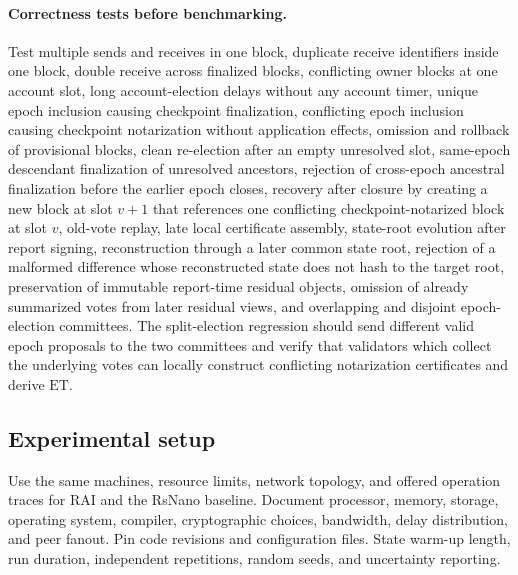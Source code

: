 \documentclass[10pt,twocolumn]{article}
\newcommand{\ET}{\mathrm{ET}}
\begin{document}
\begin{center}
\end{center}

\paragraph{Correctness tests before benchmarking.} Test multiple sends and receives in one block, duplicate receive identifiers inside one block, double receive across finalized blocks, conflicting owner blocks at one account slot, long account-election delays without any account timer, unique epoch inclusion causing checkpoint finalization, conflicting epoch inclusion causing checkpoint notarization without application effects, omission and rollback of provisional blocks, clean re-election after an empty unresolved slot, same-epoch descendant finalization of unresolved ancestors, rejection of cross-epoch ancestral finalization before the earlier epoch closes, recovery after closure by creating a new block at slot $v+1$ that references one conflicting checkpoint-notarized block at slot $v$, old-vote replay, late local certificate assembly, state-root evolution after report signing, reconstruction through a later common state root, rejection of a malformed difference whose reconstructed state does not hash to the target root, preservation of immutable report-time residual objects, omission of already summarized votes from later residual views, and overlapping and disjoint epoch-election committees. The split-election regression should send different valid epoch proposals to the two committees and verify that validators which collect the underlying votes can locally construct conflicting notarization certificates and derive $\ET$.

\subsection{Experimental setup}
Use the same machines, resource limits, network topology, and offered operation traces for RAI and the RsNano baseline. Document processor, memory, storage, operating system, compiler, cryptographic choices, bandwidth, delay distribution, and peer fanout. Pin code revisions and configuration files. State warm-up length, run duration, independent repetitions, random seeds, and uncertainty reporting.
\end{document}
